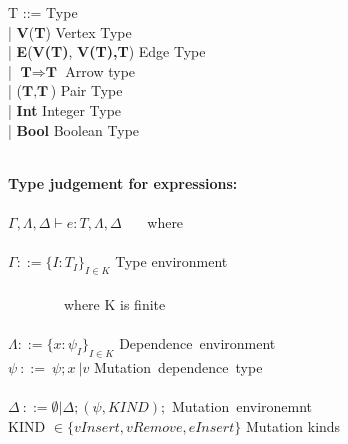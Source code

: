\begin{frame}
  \begin{tiny}
  \begin{roman-grammar}
  
  
  T ::= \>\>\>\>\> Type \\
    \ttab | \textbf{V}(\textbf{T}) \>\>\>\>\> Vertex Type \\
    \ttab | \textbf{E}(\textbf{V(T)}, \textbf{V(T),}\textbf{T}) \>\>\>\>\> Edge Type\\
    \ttab | $\textbf{T} \Rightarrow \textbf{T}$ \>\>\>\>\> Arrow type \\
    \ttab | ($\textbf{T}, \textbf{T}$) \>\>\>\>\> Pair Type \\
    \ttab | \textbf{Int} \>\>\>\>\> Integer Type \\
    \ttab | \textbf{Bool} \>\>\>\>\> Boolean Type\\ 
\ \\
\newline
\newline

  \textbf{Type judgement for expressions:}
  \\ \ \\
  $\Gamma, \Lambda, \Delta \vdash e : T, \Lambda, \Delta$ \ \ \  where \\ \ \\
  $\Gamma ::= {\{ I : T_I \}}_{I \in K}$ \>\>\>\> Type environment\\ \ \\
  \ \ \ \ \ \ \ \ where K is finite \\
  \ \\ $\Lambda ::= {\{ x: \psi_I \}}_{I \in K}$  \>\>\>\> Dependence\ environment
  \ \\ $\psi \ ::= \ \psi ;x\ | v$ \>\>\>\> Mutation\ dependence\ type\\
  \ \\ $\Delta \ ::= \emptyset | \Delta; (\psi, KIND);$ \>\>\>\> Mutation\ environemnt\\
  KIND $\in \{vInsert, vRemove, eInsert\}$ \>\>\>\>  Mutation kinds 

\end{roman-grammar}
\end{tiny}  
\end{frame}